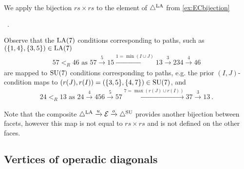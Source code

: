 \begin{example}
\label{ex:theta-path-translation}
We apply the bijection $rs\times rs$ to the element of $\triangle^{\mathrm{LA}}$ from \cref{ex:ECbijection}
\begin{center}
\quad
{}
\quad
{} \ .
\end{center}
Observe that the $\mathrm{LA}(7)$ conditions corresponding to paths, such as $( \{1,4\},\{3,5\}) \in \mathrm{LA}(7)$
\begin{align*}
    57 <_R 46 \text{ as } 57 \xrightarrow{5} 15 \xrightarrow{1=\min(I\cup J)} 13 \xrightarrow{3} 234 \xrightarrow{4} 46
\end{align*}
are mapped to $\mathrm{SU}(7)$ conditions corresponding to paths, e.g. the prior $(I,J)$-condition maps to $(r(J),r(I))=( \{3,5 \},\{4,7\}) \in \mathrm{SU}(7)$, and
\begin{align*}
    24 <_R 13 \text{ as } 24 \xrightarrow{4} 456 \xrightarrow{5} 57 \xrightarrow{7=\max(r(J)\cup r(I))} 37 \xrightarrow{3} 13 \ .
\end{align*}
\end{example}
Note that the composite $\triangle^{\mathrm{LA}} \xrightarrow{u} \mathcal{E} \xrightarrow{o} \triangle^{\mathrm{SU}}$ provides another bijection between facets, however this map is not equal to $rs \times rs$ and is not defined on the other faces.


\subsection{Vertices of operadic diagonals}

